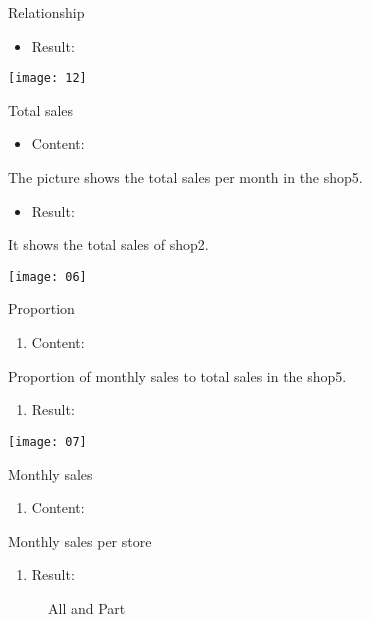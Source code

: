 \documentclass[
 size=12pt,
 paper=smartboard, %
 mode=present, %
 display=slides, %
style=tuliplab,
pauseslide,
fleqn,leqno]{powerdot}
\begin{document}
\begin{slide}{Relationship}
\center
\begin{itemize}
\item Result:
\end{itemize}
\texttt{[image: 12]}
\end{slide}



\begin{slide}{Total sales}

\begin{itemize}
\item Content:
\end{itemize}

\center  The picture shows the total sales per month in the shop5.\par

\begin{itemize}
\item Result:
\end{itemize}

It shows the total sales of shop2. \par

\texttt{[image: 06]}

\end{slide}


\begin{slide}{Proportion }
\begin{enumerate}[type=1]%
\item Content:
\end{enumerate}
\center
Proportion of monthly sales to total sales in the shop5.
\begin{enumerate}[type=1]%
\item Result:
\end{enumerate}
\texttt{[image: 07]}
\end{slide}


\begin{slide}{Monthly sales }
\begin{enumerate}[type=1]%
\item Content:
\end{enumerate}
\center
Monthly sales per store
\begin{enumerate}[type=1]%
\item Result:
\end{enumerate}


\begin{figure}[htbp]
\centering
{}%
\centering
\caption{ All and Part}
\end{figure}


\end{slide}
\end{document}

